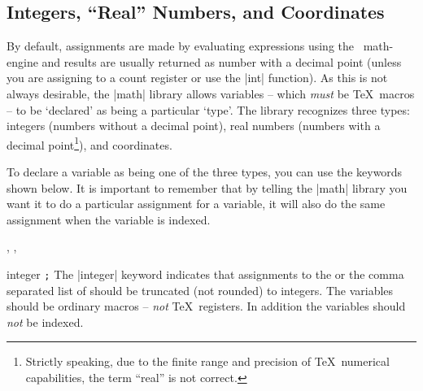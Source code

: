 \subsection{Integers, ``Real'' Numbers, and Coordinates}

By default, assignments are made by evaluating expressions using the \pgfname\
math-engine and results  are usually returned as number with a decimal point
(unless you are assigning to a count register or use the |int| function).
%
As this is not always desirable, the |math| library allows variables -- which
\emph{must} be \TeX\ macros -- to be `declared' as being a particular `type'.
The library recognizes three types: integers (numbers without a decimal point),
real numbers (numbers with a decimal point\footnote{Strictly speaking, due to
the finite range and precision of \TeX\ numerical capabilities, the term
``real'' is not correct.}), and coordinates.

To declare a variable as being one of the three types, you  can use the
keywords shown below. It is important to remember that by telling the |math|
library you want it to do a particular assignment for a variable, it will also
do the same assignment when the variable is indexed.
%
\begin{codeexample}[preamble={\usetikzlibrary{math}}]
, , 
\end{codeexample}


\begin{math-keyword}{{integer} \texttt{;}}
    The |integer| keyword indicates that assignments to the \meta{variable} or
    the comma separated list of \meta{additional variables} should be truncated
    (not rounded) to integers. The variables should be ordinary macros --
    \emph{not} \TeX\ registers. In addition the variables should \emph{not} be
    indexed.
\begin{codeexample}[preamble={\usetikzlibrary{math}},pre={\begin{lateximage}},post={\end{lateximage}}]
\end{codeexample}
\end{math-keyword}


